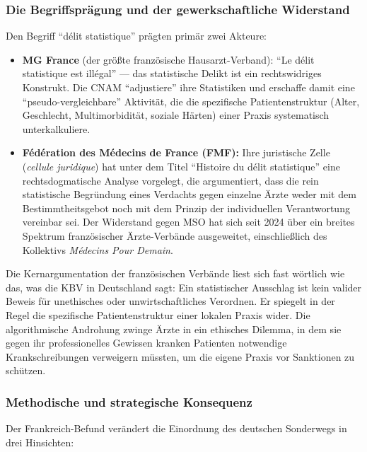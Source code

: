 \documentclass{umbruch-position}
\begin{document}
\subsubsection{Die Begriffsprägung und der gewerkschaftliche Widerstand}

Den Begriff ``d\'elit statistique'' prägten primär zwei Akteure:

\begin{itemize}[nosep]
  \item \textbf{MG France} (der größte französische Hausarzt-Verband): ``Le d\'elit statistique est ill\'egal'' --- das statistische Delikt ist ein rechtswidriges Konstrukt. Die CNAM ``adjustiere'' ihre Statistiken und erschaffe damit eine ``pseudo-vergleichbare'' Aktivität, die die spezifische Patientenstruktur (Alter, Geschlecht, Multimorbidität, soziale Härten) einer Praxis systematisch unterkalkuliere.
  \item \textbf{F\'ed\'eration des M\'edecins de France (FMF):} Ihre juristische Zelle (\textit{cellule juridique}) hat unter dem Titel ``Histoire du d\'elit statistique'' eine rechtsdogmatische Analyse vorgelegt, die argumentiert, dass die rein statistische Begründung eines Verdachts gegen einzelne Ärzte weder mit dem Bestimmtheitsgebot noch mit dem Prinzip der individuellen Verantwortung vereinbar sei. Der Widerstand gegen MSO hat sich seit 2024 über ein breites Spektrum französischer Ärzte-Verbände ausgeweitet, einschließlich des Kollektivs \textit{Médecins Pour Demain}.
\end{itemize}

Die Kernargumentation der französischen Verbände liest sich fast wörtlich wie das, was die KBV in Deutschland sagt: Ein statistischer Ausschlag ist kein valider Beweis für unethisches oder unwirtschaftliches Verordnen. Er spiegelt in der Regel die spezifische Patientenstruktur einer lokalen Praxis wider. Die algorithmische Androhung zwinge Ärzte in ein ethisches Dilemma, in dem sie gegen ihr professionelles Gewissen kranken Patienten notwendige Krankschreibungen verweigern müssten, um die eigene Praxis vor Sanktionen zu schützen.

\subsubsection{Methodische und strategische Konsequenz}

Der Frankreich-Befund verändert die Einordnung des deutschen Sonderwegs in drei Hinsichten:
\end{document}
